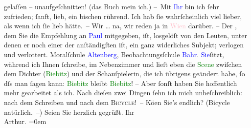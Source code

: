                gelaſſen – unaufgeſchnitten! (das Buch mein ich.)\pend
           \pstart
           – Mit \textcolor{blue}{Ihr}{} bin ich ſehr
               zufrieden; ſanft, lieb, ein bischen rührend. Ich hab ſie wahrſcheinlich viel lieber,
               als wenn ich ſie lieb hätte. – Wir {\dots} na, wir reden ja in
                  \textcolor{pink}{Wien}{}\ledrightnote{\textcolor{pink}{Wien}} darüber. –\pend
           \pstart
           {\pb}Der \label{K_L00678_1v}\label{K_L00678_1h}, dem Sie die Empfehlung an \textcolor{blue}{Paul}{}\ledrightnote{\textcolor{blue}{Paul Goldmann}} mitgegeben, iſt, losgelöſt von den
               Leuten, unter denen er noch einer der anſtändigſten iſt, ein ganz widerliches
               Subjekt; verlogen und verlottert. Moralſchule \textcolor{blue}{Altenberg}{}\ledrightnote{\textcolor{blue}{Peter Altenberg}}, Beobachtungsſchule \textcolor{blue}{Bahr}{}\ledrightnote{\textcolor{blue}{Hermann Bahr}}.\pend
           \pstart
           \textcolor{blue}{Sie}{}ſitzt, während ich Ihnen ſchreibe, im Nebenzimmer
               und lieſt eben die \textcolor{green}{Scene}{}
               zwiſchen dem {\pb}Dichter (\textcolor{green}{Biebitz}{}) und der Schauſpielerin, die ich übrigens geändert
               habe, ſo dſs man ſagen kann: \textcolor{green}{Biebitz}{} bleibt \textcolor{green}{Biebitz}{}! – Aber ſonſt haben Sie hoffentlich mehr gearbeitet als ich. Nach
               dieſen zwei Dingen ſehn ich mich unbeſchreiblich: nach dem Schreiben und nach dem \textsc{Bicycle}! – Kö{\geminationn}en Sie’s endlich?
               (Bicycle natürlich. –)\pend
           \pstart
           Seien Sie herzlich gegrüßt. Ihr{\\[\baselineskip]}\spacefill\mbox{Arthur.}\pend
           \leftskip=0em{}\endnumbering{}  
      